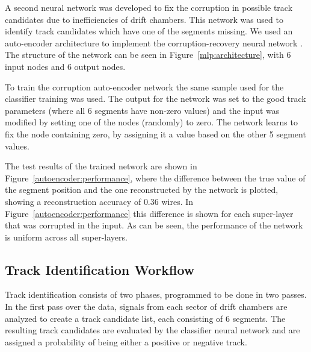 \documentclass{webofc}
\begin{document}
A second neural network was developed to fix the corruption in possible track candidates due to 
inefficiencies of drift chambers. This network was used to identify track candidates which have one of 
the segments missing. We used an auto-encoder architecture to implement the corruption-recovery 
neural network \cite{Gavalian:2020xmc}. The structure of the network can be seen in 
Figure~\ref{mlp:architecture}, with 6 input nodes and 6 output nodes.

To train the corruption auto-encoder network the same sample used for the classifier training was used.
The output for the network was set to the good track parameters (where all 6 segments have non-zero values) 
and the input was modified by setting one of the nodes (randomly) to zero. The network learns to fix the node 
containing zero, by assigning it a value based on the other 5 segment values. 

The test results of the trained network are shown in Figure~\ref{autoencoder:performance}, where the 
difference between the true value of the segment position and the one reconstructed by the network is 
plotted, showing a reconstruction accuracy of $0.36$ wires. In Figure~\ref{autoencoder:performance} 
this difference is shown for each super-layer that was corrupted in the input. As can be seen, 
the performance of the network is uniform across all super-layers.

\subsection{Track Identification Workflow}
\label{track-identification-workflow}

 Track identification consists of two phases, programmed to be done in two passes. In the first pass 
 over the data, signals from each sector of drift chambers are analyzed to create a track candidate list, 
 each consisting of 6 segments. The resulting track candidates are evaluated by the classifier neural 
 network and are assigned a probability of being either a positive or negative track. 
 

\end{document}
